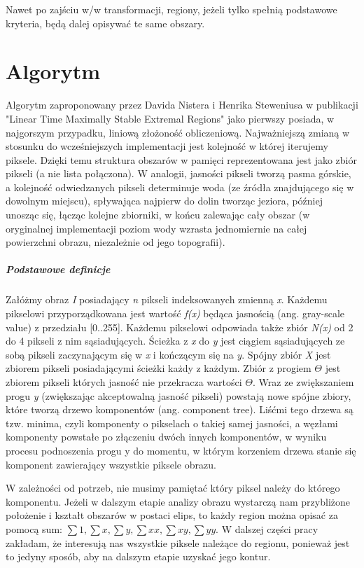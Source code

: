 Nawet po zajściu w/w transformacji, regiony, jeżeli tylko spełnią podstawowe
kryteria, będą dalej opisywać te same obszary.

\section{Algorytm}

Algorytm zaproponowany przez Davida Nistera i Henrika Steweniusa w publikacji
"Linear Time Maximally Stable Extremal Regions" \cite{Nister_Stewenius_2008}
jako pierwszy posiada, w najgorszym przypadku, liniową złożoność obliczeniową.
Najważniejszą zmianą w stosunku do wcześniejszych implementacji jest kolejność
w której iterujemy piksele. Dzięki temu struktura obszarów w pamięci
reprezentowana jest jako zbiór pikseli (a nie lista połączona). W analogii,
jasności pikseli tworzą pasma górskie, a kolejność odwiedzanych pikseli
determinuje woda (ze źródła znajdującego się w dowolnym miejscu), spływająca
najpierw do dolin tworząc jeziora, później unosząc się, łącząc kolejne
zbiorniki, w końcu zalewając cały obszar (w oryginalnej implementacji poziom
wody wzrasta jednomiernie na całej powierzchni obrazu, niezależnie od jego
topografii).

\subparagraph{Podstawowe definicje}

Załóżmy obraz \textit{I} posiadający \textit{n} pikseli indeksowanych zmienną
\textit{x}. Każdemu pikselowi przyporządkowana jest wartość \textit{f(x)}
będąca jasnością (ang. gray-scale value) z przedziału [0..255]. Każdemu
pikselowi odpowiada także zbiór \textit{N(x)} od 2 do 4 pikseli z nim
sąsiadujących. Ścieżka z \textit{x} do \textit{y} jest ciągiem sąsiadujących ze
sobą pikseli zaczynającym się w \textit{x} i kończącym się na \textit{y}.
Spójny zbiór \textit{X} jest zbiorem pikseli posiadającymi ścieżki każdy z
każdym. Zbiór z progiem $\Theta$ jest zbiorem pikseli których jasność nie
przekracza wartości $\Theta$. Wraz ze zwiększaniem progu \textit{y} (zwiększając
akceptowalną jasność pikseli) powstają nowe spójne zbiory, które tworzą drzewo
komponentów (ang. component tree). Liśćmi tego drzewa są tzw. minima, czyli
komponenty o pikselach o takiej samej jasności, a węzłami komponenty powstałe
po złączeniu dwóch innych komponentów, w wyniku procesu podnoszenia progu y do
momentu, w którym korzeniem drzewa stanie się komponent zawierający wszystkie
piksele obrazu.

W zależności od potrzeb, nie musimy pamiętać który piksel należy do którego
komponentu. Jeżeli w dalszym etapie analizy obrazu wystarczą nam przybliżone
położenie i kształt obszarów w postaci elips, to każdy region można opisać za
pomocą sum: $\sum{1}, \sum{x}, \sum{y}, \sum{xx}, \sum{xy}, \sum{yy}$. W
dalszej części pracy zakładam, że interesują nas wszystkie piksele należące do
regionu, ponieważ jest to jedyny sposób, aby na dalszym etapie uzyskać jego
kontur.

